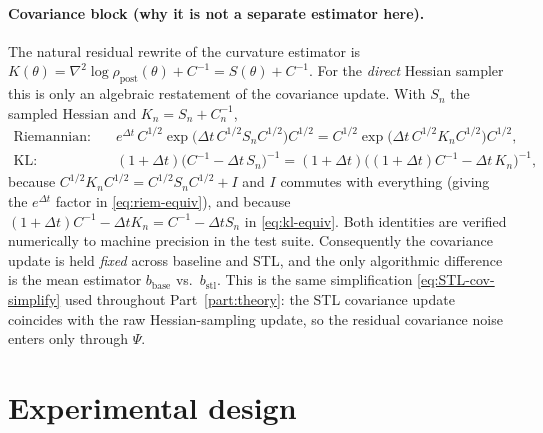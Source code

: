 \documentclass[11pt]{article}
\theoremstyle{plain}
\theoremstyle{definition}
\theoremstyle{remark}
\newcommand{\post}{\mathrm{post}}
\newcommand{\bbase}{b_{\mathrm{base}}}
\newcommand{\bstl}{b_{\mathrm{stl}}}
\begin{document}
\paragraph{Covariance block (why it is not a separate estimator here).}
The natural residual rewrite of the curvature estimator is
$K(\theta)=\nabla^2\log\rho_\post(\theta)+C^{-1}=S(\theta)+C^{-1}$. For the
\emph{direct} Hessian sampler this is only an algebraic restatement of the
covariance update. With $S_n$ the sampled Hessian and $K_n=S_n+C_n^{-1}$,
\begin{align}
\text{Riemannian:}\quad
 & e^{\Delta t}\,C^{1/2}\exp\!\big(\Delta t\,C^{1/2}S_nC^{1/2}\big)C^{1/2}
 = C^{1/2}\exp\!\big(\Delta t\,C^{1/2}K_nC^{1/2}\big)C^{1/2},
 \label{eq:riem-equiv}\\
\text{KL:}\quad
 & (1+\Delta t)\big(C^{-1}-\Delta t\,S_n\big)^{-1}
 = (1+\Delta t)\big((1+\Delta t)C^{-1}-\Delta t\,K_n\big)^{-1},
 \label{eq:kl-equiv}
\end{align}
because $C^{1/2}K_nC^{1/2}=C^{1/2}S_nC^{1/2}+I$ and $I$ commutes with everything
(giving the $e^{\Delta t}$ factor in \eqref{eq:riem-equiv}), and because
$(1+\Delta t)C^{-1}-\Delta t K_n=C^{-1}-\Delta t S_n$ in \eqref{eq:kl-equiv}.
Both identities are verified numerically to machine precision in the test suite.
Consequently the covariance update is held \emph{fixed} across baseline and STL,
and the only algorithmic difference is the mean estimator $\bbase$ vs.\ $\bstl$.
This is the same simplification \eqref{eq:STL-cov-simplify} used throughout
Part~\ref{part:theory}: the STL covariance update coincides with the raw
Hessian-sampling update, so the residual covariance noise enters only through $\Psi$.

\section{Experimental design}
\label{sec:design}
\end{document}

